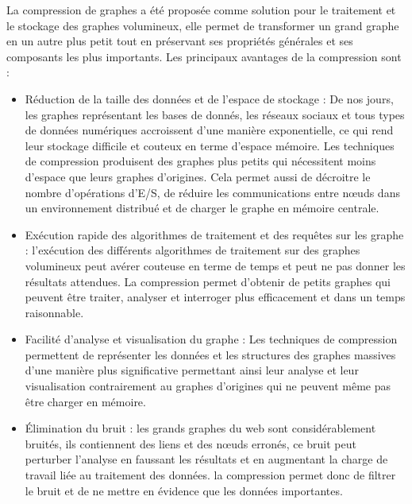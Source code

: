 La compression de graphes a été proposée comme solution pour le traitement et le stockage des graphes volumineux, elle permet de transformer un grand graphe en un autre plus petit tout en préservant ses propriétés générales et ses composants les plus importants.
Les principaux avantages de la compression sont  \citep{liu2018graph} :
\begin{itemize}

\item Réduction de la taille des données et de l'espace de stockage : De nos jours, les graphes représentant les bases de donnés, les réseaux sociaux et tous types de données numériques accroissent d'une manière exponentielle, ce qui rend leur stockage difficile et couteux en terme d'espace mémoire. Les techniques de compression produisent des graphes plus petits qui nécessitent moins d'espace que leurs graphes d'origines. Cela permet aussi de décroitre le nombre d'opérations d'E/S, de réduire les communications entre nœuds dans un environnement distribué et de charger le graphe en mémoire centrale.   

\item Exécution rapide des algorithmes de traitement et des requêtes sur les graphe : l'exécution des différents algorithmes de traitement sur des graphes volumineux peut avérer couteuse en terme de temps et peut ne pas donner les résultats attendues. La compression permet d'obtenir de petits graphes qui peuvent être traiter, analyser et interroger plus efficacement et dans un temps raisonnable. 
  
\item Facilité d'analyse et visualisation du graphe : Les techniques de compression permettent de représenter les données et les structures des graphes massives d'une manière plus significative permettant ainsi leur analyse et leur visualisation contrairement au graphes d'origines qui ne peuvent même pas être charger en mémoire.  

\item Élimination du bruit : les grands graphes du web sont considérablement bruités, ils contiennent des liens et des nœuds erronés, ce bruit peut perturber l'analyse en faussant les résultats et en augmentant la charge de travail liée au traitement des données. la compression permet donc de filtrer le bruit et de ne mettre en évidence que les données importantes.

\end{itemize}


